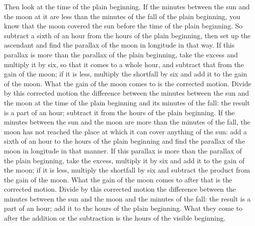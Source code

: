 \documentclass[11pt]{article}
\newcommand{\ArPage}[1]{\marginpar{\footnotesize\color{gray}Ar.\,p.\,#1}}
\begin{document}
\par \ArPage{163}Then look at the time of the plain beginning. If the minutes between the sun and the moon at it are less than the minutes of the fall of the plain beginning, you know that the moon covered the sun before the time of the plain beginning. So subtract a sixth of an hour from the hours of the plain beginning, then set up the ascendant and find the parallax of the moon in longitude in that way. If this parallax is more than the parallax of the plain beginning, take the excess and multiply it by six, so that it comes to a whole hour, and subtract that from the gain of the moon; if it is less, multiply the shortfall by six and add it to the gain of the moon. What the gain of the moon comes to is the corrected motion. Divide by this corrected motion the difference between the minutes between the sun and the moon at the time of the plain beginning and its minutes of the fall: the result is a part of an hour; subtract it from the hours of the plain beginning. If the minutes between the sun and the moon are more than the minutes of the fall, the moon has not reached the place at which it can cover anything of the sun: add a sixth of an hour to the hours of the plain beginning and find the parallax of the moon in longitude in that manner. If this parallax is more than the parallax of the plain beginning, take the excess, multiply it by six and add it to the gain of the moon; if it is less, multiply the shortfall by six and subtract the product from the gain of the moon. What the gain of the moon comes to after that is the corrected motion. Divide by this corrected motion the difference between the minutes between the sun and the moon and the minutes of the fall: the result is a part of an hour; add it to the hours of the plain beginning. What they come to after the addition or the subtraction is the hours of the visible beginning.\par
\end{document}
